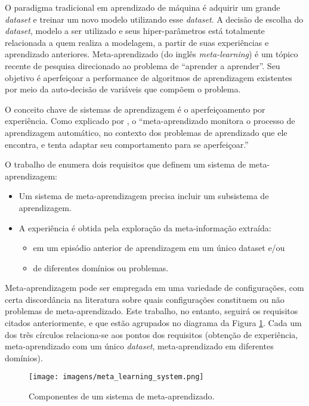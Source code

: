 \documentclass[
12pt,       %
openright,      %
oneside,      %
a4paper,      %
english,      %
french,       %
spanish,      %
brazil        %
]{abntex2}
\begin{document}
O paradigma tradicional em aprendizado de máquina é adquirir um grande \textit{dataset} e treinar um novo modelo utilizando esse \textit{dataset}. A decisão de escolha do \textit{dataset}, modelo a ser utilizado e seus hiper-parâmetros está totalmente relacionada a quem realiza a modelagem, a partir de suas experiências e aprendizado anteriores. Meta-aprendizado (do inglês \textit{meta-learning}) é um tópico recente de pesquisa direcionado ao problema de ``aprender a aprender''. Seu objetivo é aperfeiçoar a performance de algoritmos de aprendizagem existentes por meio da auto-decisão de variáveis que compõem o problema.

O conceito chave de sistemas de aprendizagem é o aperfeiçoamento por experiência. Como explicado por , o ``meta-aprendizado monitora o processo de aprendizagem automático, no contexto dos problemas de aprendizado que ele encontra, e tenta adaptar seu comportamento para se aperfeiçoar.''

O trabalho de  enumera dois requisitos que definem um sistema de meta-aprendizagem:

\begin{itemize}
    \item Um sistema de meta-aprendizagem precisa incluir um subsistema de aprendizagem.
    \item A experiência é obtida pela exploração da meta-informação extraída:
    \begin{itemize}
        \item em um episódio anterior de aprendizagem em um único dataset e/ou
        \item de diferentes domínios ou problemas.
    \end{itemize}
\end{itemize}

Meta-aprendizagem pode ser empregada em uma variedade de configurações, com certa discordância na literatura sobre quais configurações constituem ou não problemas de meta-aprendizado. Este trabalho, no entanto, seguirá  os requisitos citados anteriormente, e que estão agrupados no diagrama da Figura \ref{fig:meta_learning_system}. Cada um dos três círculos relaciona-se aos pontos dos requisitos (obtenção de experiência, meta-aprendizado com um único \textit{dataset}, meta-aprendizado em diferentes domínios).

\begin{figure}[ht]
\centering
\caption{Componentes de um sistema de meta-aprendizado.}
\texttt{[image: imagens/meta\_learning\_system.png]}
\label{fig:meta_learning_system}
\end{figure}
\end{document}
